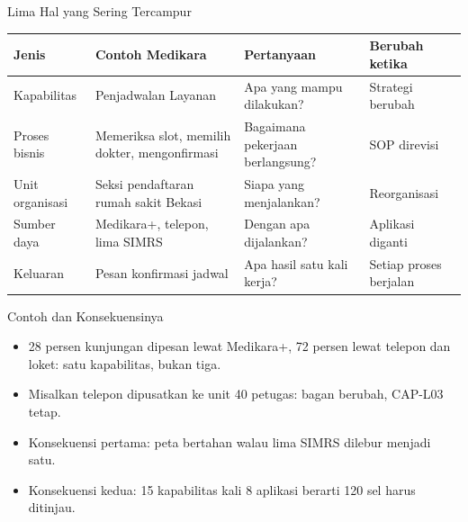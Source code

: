 \documentclass[aspectratio=169, table, 12pt]{beamer}
\begin{document}
\begin{frame}{{\Large Lima Hal yang Sering Tercampur}}
  \footnotesize
  \begin{tabularx}{\textwidth}{>{\raggedright\arraybackslash}p{2.3cm}
      >{\raggedright\arraybackslash}X >{\raggedright\arraybackslash}p{3.6cm}
      >{\raggedright\arraybackslash}p{3.3cm}}
    \hline
    \textbf{Jenis} & \textbf{Contoh Medikara} & \textbf{Pertanyaan} & \textbf{Berubah ketika} \\
    \hline
    Kapabilitas & Penjadwalan Layanan & Apa yang mampu dilakukan? & Strategi berubah \\
    \hline
    Proses bisnis & Memeriksa slot, memilih dokter, mengonfirmasi & Bagaimana pekerjaan berlangsung? & SOP direvisi \\
    \hline
    Unit organisasi & Seksi pendaftaran rumah sakit Bekasi & Siapa yang menjalankan? & Reorganisasi \\
    \hline
    Sumber daya & Medikara+, telepon, lima SIMRS & Dengan apa dijalankan? & Aplikasi diganti \\
    \hline
    Keluaran & Pesan konfirmasi jadwal & Apa hasil satu kali kerja? & Setiap proses berjalan \\
    \hline
  \end{tabularx}
\end{frame}

\begin{frame}{{\Large Contoh dan Konsekuensinya}}
  \vspace{10pt}
  \begin{itemize}
    \item 28 persen kunjungan dipesan lewat Medikara+, 72 persen lewat telepon dan loket: satu kapabilitas,
          bukan tiga.
    \item Misalkan telepon dipusatkan ke unit 40 petugas: bagan berubah, CAP-L03 tetap.
    \item Konsekuensi pertama: peta bertahan walau lima SIMRS dilebur menjadi satu.
    \item Konsekuensi kedua: 15 kapabilitas kali 8 aplikasi berarti 120 sel harus ditinjau.
  \end{itemize}
\end{frame}
\end{document}
